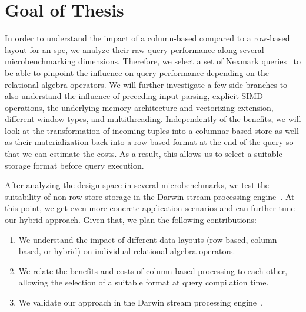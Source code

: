 \section{Goal of Thesis}
\label{sec:goal}

In order to understand the impact of a column-based compared to a row-based layout for an \ac{spe}, we analyze their raw query performance along several microbenchmarking dimensions.
Therefore, we select a set of Nexmark queries~\cite{tucker2008nexmark} to be able to pinpoint the influence on query performance depending on the relational algebra operators.
We will further investigate a few side branches to also understand the influence of preceding input parsing, explicit SIMD operations, the underlying memory architecture and vectorizing extension, different window types, and multithreading. 
Independently of the benefits, we will look at the transformation of incoming tuples into a columnar-based store as well as their materialization back into a row-based format at the end of the query so that we can estimate the costs.
As a result, this allows us to select a suitable storage format before query execution.

After analyzing the design space in several microbenchmarks, we test the suitability of non-row store storage in the Darwin stream processing engine~\cite{DBLP:conf/cidr/BensonR22}.
At this point, we get even more concrete application scenarios and can further tune our hybrid approach. 
Given that, we plan the following contributions:
\begin{enumerate}
    \item We understand the impact of different data layouts (row-based, column-based, or hybrid) on individual relational algebra operators.
    \item We relate the benefits and costs of column-based processing to each other, allowing the selection of a suitable format at query compilation time.
    \item We validate our approach in the Darwin stream processing engine~\cite[]{DBLP:conf/cidr/BensonR22}.
\end{enumerate}